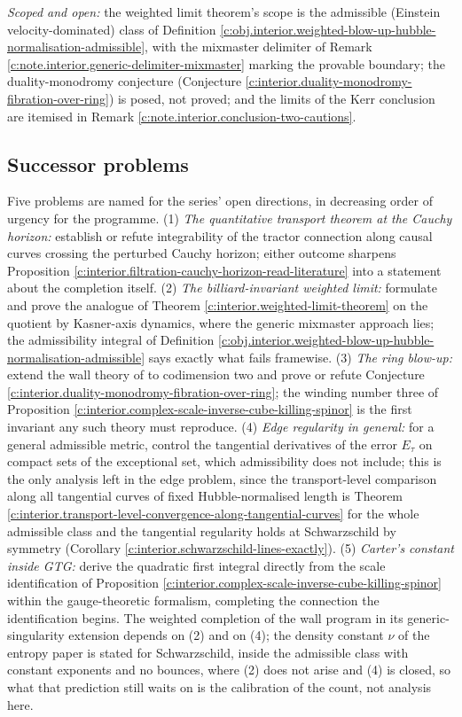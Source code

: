 \documentclass[11pt]{article}
\theoremstyle{definition}
\theoremstyle{plain}
\begin{document}
\emph{Scoped and open:} the weighted limit theorem's scope is the admissible (Einstein velocity-dominated) class of Definition \ref{c:obj.interior.weighted-blow-up-hubble-normalisation-admissible}, with the mixmaster delimiter of Remark \ref{c:note.interior.generic-delimiter-mixmaster} marking the provable boundary; the duality-monodromy conjecture (Conjecture \ref{c:interior.duality-monodromy-fibration-over-ring}) is posed, not proved; and the limits of the Kerr conclusion are itemised in Remark \ref{c:note.interior.conclusion-two-cautions}.

\subsection*{Successor problems}
\label{c:note.interior.setting-successor-problems}
Five problems are named for the series' open directions, in decreasing order of urgency for the programme. (1) \emph{The quantitative transport theorem at the Cauchy horizon:} establish or refute integrability of the tractor connection along causal curves crossing the perturbed Cauchy horizon; either outcome sharpens Proposition \ref{c:interior.filtration-cauchy-horizon-read-literature} into a statement about the completion itself. (2) \emph{The billiard-invariant weighted limit:} formulate and prove the analogue of Theorem \ref{c:interior.weighted-limit-theorem} on the quotient by Kasner-axis dynamics, where the generic mixmaster approach lies; the admissibility integral of Definition \ref{c:obj.interior.weighted-blow-up-hubble-normalisation-admissible} says exactly what fails framewise. (3) \emph{The ring blow-up:} extend the wall theory of \cite{ButlerT4} to codimension two and prove or refute Conjecture \ref{c:interior.duality-monodromy-fibration-over-ring}; the winding number three of Proposition \ref{c:interior.complex-scale-inverse-cube-killing-spinor} is the first invariant any such theory must reproduce. (4) \emph{Edge regularity in general:} for a general admissible metric, control the tangential derivatives of the error $E_{\tau}$ on compact sets of the exceptional set, which admissibility does not include; this is the only analysis left in the edge problem, since the transport-level comparison along all tangential curves of fixed Hubble-normalised length is Theorem \ref{c:interior.transport-level-convergence-along-tangential-curves} for the whole admissible class and the tangential regularity holds at Schwarzschild by symmetry (Corollary \ref{c:interior.schwarzschild-lines-exactly}). (5) \emph{Carter's constant inside GTG:} derive the quadratic first integral directly from the scale identification of Proposition \ref{c:interior.complex-scale-inverse-cube-killing-spinor} within the gauge-theoretic formalism, completing the connection the identification begins. The weighted completion of the wall program in its generic-singularity extension depends on (2) and on (4); the density constant $\nu$ of the entropy paper is stated for Schwarzschild, inside the admissible class with constant exponents and no bounces, where (2) does not arise and (4) is closed, so what that prediction still waits on is the calibration of the count, not analysis here.
\end{document}
